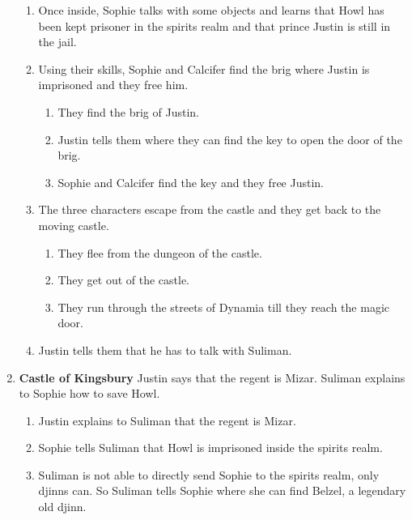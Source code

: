 \begin{enumerate}
\begin{enumerate}
  \item Once inside, Sophie talks with some objects and learns that Howl has been kept prisoner in the spirits realm and that prince Justin is still in the jail.
    
  \item Using their skills, Sophie and Calcifer find the brig where Justin is imprisoned and they free him.
    
  \begin{enumerate}
    \item They find the brig of Justin.
    
    \item Justin tells them where they can find the key to open the door of the brig.
	    
    \item Sophie and Calcifer find the key and they free Justin.
  \end{enumerate}
    
  \item The three characters escape from the castle and they get back to the moving castle.
    
  \begin{enumerate}
    \item They flee from the dungeon of the castle.
    
    \item They get out of the castle.
    
    \item They run through the streets of Dynamia till they reach the magic door.
  \end{enumerate}
    
  \item Justin tells them that he has to talk with Suliman.
  \end{enumerate}

\item \textbf{Castle of Kingsbury} Justin says that the regent is Mizar. Suliman explains to Sophie how to save Howl.

  \begin{enumerate}
    \item Justin explains to Suliman that the regent is Mizar.
    
    \item Sophie tells Suliman that Howl is imprisoned inside the spirits realm.
    
    \item Suliman is not able to directly send Sophie to the spirits realm, only djinns can. So Suliman tells Sophie where she can find Belzel, a legendary old djinn.
    

\end{enumerate}
\end{enumerate}
